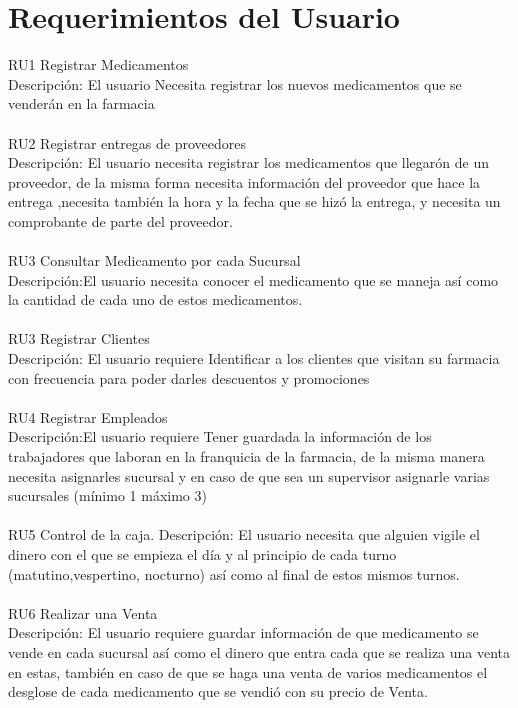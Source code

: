 \section{Requerimientos del Usuario}
RU1 Registrar Medicamentos\\
Descripción: El usuario Necesita registrar los nuevos medicamentos que se venderán en la farmacia\\
\\
RU2 Registrar entregas de proveedores\\
Descripción: El usuario necesita registrar los medicamentos que llegarón de un proveedor, de la misma forma necesita información del proveedor que hace la entrega ,necesita también la hora y la fecha que se hizó la entrega, y necesita un comprobante de parte del proveedor.\\
\\
RU3 Consultar Medicamento por cada Sucursal\\
Descripción:El usuario necesita conocer el medicamento que se maneja así como la cantidad de cada uno de estos medicamentos.\\
\\
RU3 Registrar Clientes\\
Descripción: El usuario requiere Identificar a los clientes que visitan su farmacia con frecuencia para poder darles descuentos y promociones\\
\\
RU4 Registrar Empleados\\
Descripción:El usuario requiere Tener guardada la información de los trabajadores que laboran en la franquicia de la farmacia, de la misma manera necesita asignarles sucursal y en caso de que sea un supervisor asignarle varias sucursales (mínimo 1 máximo 3) \\
\\
RU5 Control de la caja.
Descripción: El usuario necesita que alguien vigile el dinero con el que se empieza el día y al principio de cada turno (matutino,vespertino, nocturno) así como al final de estos mismos turnos.\\
\\
RU6 Realizar una Venta\\
Descripción: El usuario requiere guardar información de que medicamento se vende en cada sucursal así como el dinero que entra cada que se realiza una venta en estas, también en caso de que se haga una venta de varios medicamentos el desglose de cada medicamento que se vendió con su precio de Venta.\\
\\
